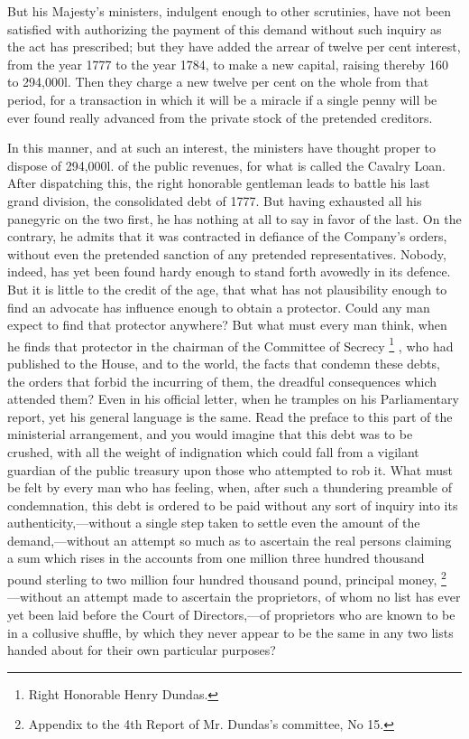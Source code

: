 But his Majesty's ministers, indulgent enough to other scrutinies, have not been satisfied with authorizing the payment of this demand without such inquiry as the act has prescribed; but they have added the arrear of twelve per cent interest, from the year 1777 to the year 1784, to make a new capital, raising thereby 160 to 294,000l. Then they charge a new twelve per cent on the whole from that period, for a transaction in which it will be a miracle if a single penny will be ever found really advanced from the private stock of the pretended creditors.

In this manner, and at such an interest, the ministers have thought proper to dispose of 294,000l. of the public revenues, for what is called the Cavalry Loan. After dispatching this, the right honorable gentleman leads to battle his last grand division, the consolidated debt of 1777. But having exhausted all his panegyric on the two first, he has nothing at all to say in favor of the last. On the contrary, he admits that it was contracted in defiance of the Company's orders, without even the pretended sanction of any pretended representatives. Nobody, indeed, has yet been found hardy enough to stand forth avowedly in its defence. But it is little to the credit of the age, that what has not plausibility enough to find an advocate has influence enough to obtain a protector. Could any man expect to find that protector anywhere? But what must every man think, when he finds that protector in the chairman of the Committee of Secrecy
\footnote{ Right Honorable Henry Dundas.}
, who had published to the House, and to the world, the facts that condemn these debts, the orders that forbid the incurring of them, the dreadful consequences which attended them? Even in his official letter, when he tramples on his Parliamentary report, yet his general language is the same. Read the preface to this part of the ministerial arrangement, and you would imagine that this debt was to be crushed, with all the weight of indignation which could fall from a vigilant guardian of the public treasury upon those who attempted to rob it. What must be felt by every man who has feeling, when, after such a thundering preamble of condemnation, this debt is ordered to be paid without any sort of inquiry into its authenticity,—without a single step taken to settle even the amount of the demand,—without an attempt so much as to ascertain the real persons claiming a sum which rises in the accounts from one million three hundred thousand pound sterling to two million four hundred thousand pound, principal money,
\footnote{ Appendix to the 4th Report of Mr. Dundas's committee, No 15.}
—without an attempt made to ascertain the proprietors, of whom no list has ever yet been laid before the Court of Directors,—of proprietors who are known to be in a collusive shuffle, by which they never appear to be the same in any two lists handed about for their own particular purposes?

